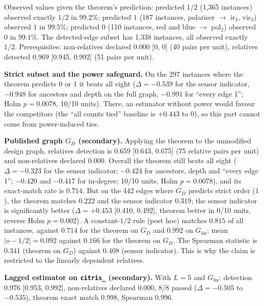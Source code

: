 Observed values given the theorem's prediction: predicted $1/2$ (1{,}365 instances) observed exactly $1/2$ in $99.2\%$; predicted $1$ (187 instances,
polariser $\to$ ir$_3$, vis$_3$) observed $1$ in $99.5\%$; predicted $0$ (110 instances, red and blue $\to$ pol$_2$) observed $0$ in $99.1\%$. The detected-edge subset has 1{,}338 instances, all observed exactly $1/2$.
Prerequisites: non-relatives declared $0.000$ [0, 0] (40 pairs per unit), relatives detected $0.969$ [0.945, 0.992] (51 pairs per unit).

\textbf{Strict subset and the power safeguard.} On the 297 instances where the theorem predicts $0$ or $1$ it beats all eight ($\Delta=-0.539$ for the sensor indicator, $-0.948$ for ancestors and depth on the full graph, $-0.991$ for ``every edge 1'';
Holm $p=0.0078$, 10/10 units). There, an estimator without power would favour the competitors (the ``all counts tied'' baseline is $+0.443$ to $0$), so this part cannot come from power-induced ties.

\textbf{Published graph $G_D$ (secondary).} Applying the theorem to the unmodified design graph, relatives detection is $0.659$ [0.643, 0.675] (75 relative pairs per unit) and non-relatives declared $0.000$.
Overall the theorem still beats all eight ($\Delta=-0.323$ for the sensor indicator; $-0.424$ for ancestors, depth and ``every edge 1''; $-0.420$ and $-0.417$ for in-degree; 10/10 units, Holm $p=0.0078$), and its exact-match rate is $0.714$.
But on the 442 edges where $G_D$ predicts strict order ($1$), the theorem matches $0.222$ and the sensor indicator $0.319$; the sensor indicator is significantly better
($\Delta=+0.453$ [0.410, 0.492], theorem better in 0/10 units, reverse Holm $p=0.002$). A constant-$1/2$ rule (post hoc) matches $0.815$ of all instances, against $0.714$ for the theorem on $G_D$ and $0.992$ on $G_{\mathrm{lin}}$;
mean $|o-1/2|=0.092$ against $0.166$ for the theorem on $G_D$. The Spearman statistic is $0.341$ (theorem on $G_D$) against $0.408$ (sensor indicator). This is why the claim is restricted to the linearly dependent relatives.

\textbf{Lagged estimator on \texttt{citris\_} (secondary).} With $L=5$ and $G_{\mathrm{lin}}$: detection $0.976$ [0.953, 0.992], non-relatives declared $0.000$, 8/8 passed ($\Delta=-0.505$ to $-0.535$), theorem exact match $0.998$, Spearman $0.996$.

